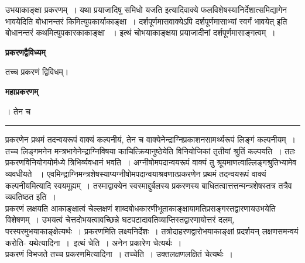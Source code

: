 \documentclass[11pt, openany]{book}
\begin{document}
{\bl उभयाकाङ्क्षा प्रकरणम्~। यथा प्रयाजादिषु {\qtl समिधो यजति} इत्यादिवाक्ये फलविशेषस्यानिर्देशात्समिद्यागेन भावयेदिति बोधानन्तरं किमित्युपकार्याकाङ्क्षा~। दर्शपूर्णमासवाक्येऽपि {\qtl दर्शपूर्णमासाभ्यां स्वर्गं भावयेत्} इति बोधानन्तरं कथमित्युपकारकाकाङ्क्षा ~। इत्थं चोभयाकाङ्क्षया  प्रयाजादीनां दर्शपूर्णमासाङ्गत्वम्~।}
\begin{center}
\textbf{प्रकरणद्वैविध्यम्}    
\end{center}

{\bl तच्च प्रकरणं द्विविधम्।}
\begin{center}
 \textbf{महाप्रकरणम्}   
\end{center}
 
{। तेन च}\\
\hrule
\vspace{3mm}
\noindent
प्रकरणेन प्रथमं तदन्वयरूपं वाक्यं कल्पनीयं, तेन च वाक्येनेन्द्राग्निप्रकाशनसामर्थ्यरूपं लिङ्गं कल्पनीयम्~। तच्च लिङ्गमनेन मन्त्रभागेनेन्द्राग्निविषया काचित्क्रियानुष्ठेयेति विनियोजिकां तृतीयां श्रुतिं कल्पयति~। ततः प्रकरणविनियोगयोर्मध्ये त्रिभिर्व्यवधानं भवति~। अग्नीषोमपदान्वयरूपं वाक्यं तु श्रूयमाणत्वाल्लिङ्गश्रुतिभ्यामेव व्यवधीयते
~। एवमिन्द्राग्निमन्त्रशेषस्याप्यग्नीषोमपदान्वयाश्रवणात्प्रकरणेन प्रथमं तदन्वयरूपं वाक्यं कल्पनीयमित्यादि स्वयमूह्यम्~। तस्माद्वाक्येन स्वस्माद्दुर्बलस्य प्रकरणस्य बाधितत्वात्तत्तन्मन्त्रशेषस्तत्र तत्रैव व्यवतिष्ठत इति~।\\

 प्रकरणं लक्षयति आकाङ्क्षात्वं चेल्लक्षणं शाब्दबोधकारणीभूताकाङ्क्षायामतिप्रसङ्गस्तद्वारणायउभयेति विशेषणम्~। उभयत्वं चेत्तदोभयत्वावच्छिन्ने घटपटादावतिव्याप्तिस्तद्वारणायोत्तरं दलम्, परस्परमुभयाकाङ्क्षेत्यर्थः~। प्रकरणमिति लक्ष्यनिर्देशः~। तत्रोदाहरणद्वारोभयाकाङ्क्षां प्रदर्शयन् लक्षणसमन्वयं करोति- {\br यथेत्यादिना~।~इत्थं चेति~।} अनेन प्रकारेण चेत्यर्थः~।\\

 प्रकरणं विभजते {\br तच्च प्रकरणमित्यादिना~। तच्चेति~।}  उक्तलक्षणलक्षितं चेत्यर्थः~।\\
\end{document}
